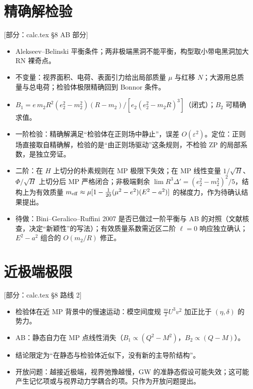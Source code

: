\documentclass[11pt,a4paper]{ctexart}
\newcommand{\status}[1]{\hfill{\small\color{blue!50!black}[#1]}}
\begin{document}
\section{精确解检验}\label{sec:o-exact}
\status{部分：calc.tex \S8 AB 部分}
\begin{itemize}[nosep]
\item Alekseev--Belinski 平衡条件；两非极端黑洞不能平衡，构型取小带电黑洞加大 RN 裸奇点。
\item 不变量：视界面积、电荷、表面引力给出局部质量 $\mu$ 与红移 $N$；大源用总质量与总电荷；检验体极限精确回到 Bonnor 条件。
\item $B_1=e\,m_2R^2(e_2^2-m_2^2)(R-m_2)/[e_2(e_2^2-m_2R)^3]$（闭式）；$B_2$ 可精确求值。
\item 一阶检验：精确解满足“检验体在正则场中静止”，误差 $O(\varepsilon^2)$。定位：正则场直接取自精确解，检验的是“由正则场驱动”这条规则，不检验 ZP 的局部系数，是独立旁证。
\item 二阶：在 $H$ 上切分的朴素规则在 MP 极限下失效；在 MP 线性变量 $1/\sqrt H$、$\Phi/\sqrt H$ 上切分后 MP 严格闭合；非极端剩余 $\lim R^3\Delta'=(e_2^2-m_2^2)^2/5$，结构上为有效质量 $m_{\rm eff}\approx\mu[1-\tfrac1{20}(\mu^2-e^2)(E^2-a^2)]$ 的梯度力，作为待确认结果提出。
\item 待做：Bini--Geralico--Ruffini 2007 是否已做过一阶平衡与 AB 的对照（文献核查，决定“新颖性”的写法）；有效质量系数需近区二阶 $\ell=0$ 响应独立确认；$E^2-a^2$ 组合的 $O(m_2/R)$ 修正。
\end{itemize}

\section{近极端极限}\label{sec:o-extremal}
\status{部分：calc.tex \S8 路线 2}
\begin{itemize}[nosep]
\item 检验体在近 MP 背景中的慢速运动：模空间度规 $\tfrac m2U^3v^2$ 加正比于 $(\eta,\delta)$ 的势力。
\item AB：静态自力在 MP 点线性消失（$B_1\propto(Q^2-M^2)$，$B_2\propto(Q-M)$）。
\item 结论限定为“在静态与检验体近似下，没有新的主导阶结构”。
\item 开放问题：越接近极端，视界弛豫越慢，GW 的准静态假设可能失效；这可能产生记忆项或与视界动力学耦合的项。只作为开放问题提出。
\end{itemize}
\end{document}

